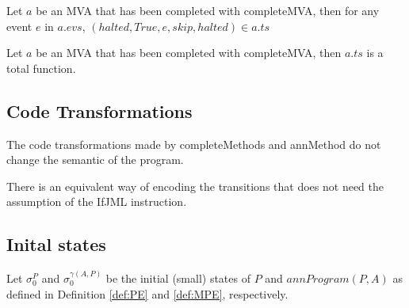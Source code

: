 \documentclass[a4paper,10pt]{article}
\begin{document}
\begin{property}
  Let $a$ be an MVA that has been completed with \<completeMVA\>, then for any event $e$ in $a.evs$,
$(halted, True, e, skip, halted) \in a.ts$
\end{property}

\begin{property}
  Let $a$ be an MVA that has been completed with \<completeMVA\>, then $a.ts$ is a total function.
\end{property}


\subsection{Code Transformations}
\begin{property}
  The code transformations made by \<completeMethods\> and \<annMethod\> do not change the semantic of the
program.
\end{property}

\begin{property}
  There is an equivalent way of encoding the transitions that does not need the assumption of the \<IfJML\>
instruction.
\end{property}


\subsection{Inital states}
  Let $\sigma_0^P$ and $\sigma_0^{\gamma(A,P)}$ be the initial (small) states of $P$ and $annProgram(P, A)$ as
defined
in Definition \ref{def:PE} and \ref{def:MPE}, respectively.
\end{document}
